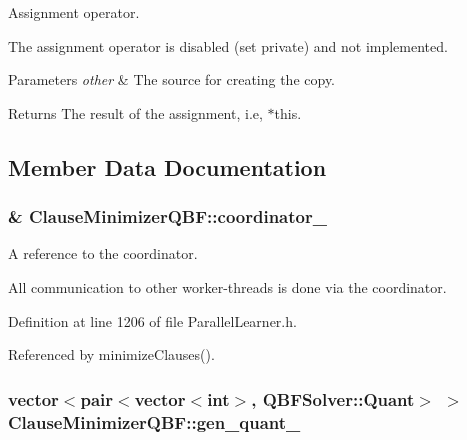 Assignment operator. 

The assignment operator is disabled (set private) and not implemented.


\begin{DoxyParams}{Parameters}
{\em other} & The source for creating the copy. \\
\hline
\end{DoxyParams}
\begin{DoxyReturn}{Returns}
The result of the assignment, i.\-e, $\ast$this. 
\end{DoxyReturn}


\subsection{Member Data Documentation}
\hypertarget{classClauseMinimizerQBF_afff0ec1ad36fe55af388320c9b55f162}{
\subsubsection[{coordinator\-\_\-}]{\& Clause\-Minimizer\-Q\-B\-F\-::coordinator\-\_\-\hspace{0.3cm}{\ttfamily [protected]}}}\label{classClauseMinimizerQBF_afff0ec1ad36fe55af388320c9b55f162}


A reference to the coordinator. 

All communication to other worker-\/threads is done via the coordinator. 

Definition at line 1206 of file Parallel\-Learner.\-h.



Referenced by minimize\-Clauses().

\hypertarget{classClauseMinimizerQBF_a4bd08f4de32c9a738e48cae22b93fa22}{
\subsubsection[{gen\-\_\-quant\-\_\-}]{\setlength{\rightskip}{0pt plus 5cm}vector$<$pair$<$vector$<$int$>$, {\bf Q\-B\-F\-Solver\-::\-Quant}$>$ $>$ Clause\-Minimizer\-Q\-B\-F\-::gen\-\_\-quant\-\_\-\hspace{0.3cm}{\ttfamily [protected]}}}\label{classClauseMinimizerQBF_a4bd08f4de32c9a738e48cae22b93fa22}


